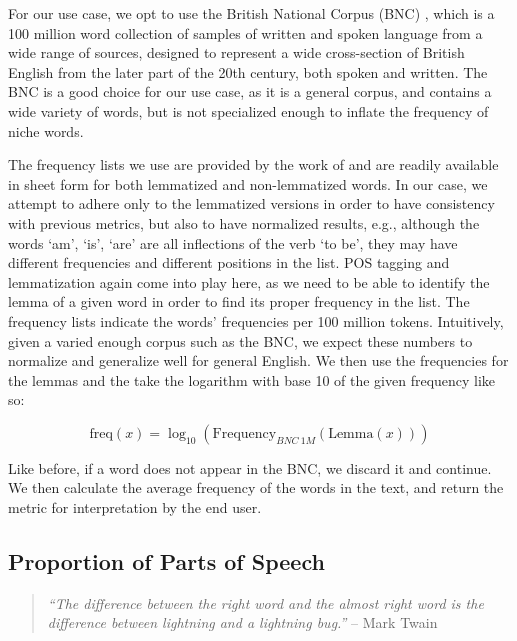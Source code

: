 For our use case, we opt to use the British National Corpus (BNC) \citep{bnc-20.500.14106/2554}, which is a 100 million word collection of samples of written and spoken language from a wide range of sources, designed to represent a wide cross-section of British English from the later part of the 20th century, both spoken and written. The BNC is a good choice for our use case, as it is a general corpus, and contains a wide variety of words, but is not specialized enough to inflate the frequency of niche words. 

The frequency lists we use are provided by the work of \cite{leech_rayson_wilson_2014} and are readily available in sheet form for both lemmatized and non-lemmatized words. In our case, we attempt to adhere only to the lemmatized versions in order to have consistency with previous metrics, but also to have normalized results, e.g., although the words `am', `is', `are' are all inflections of the verb `to be', they may have different frequencies and different positions in the list. POS tagging and lemmatization again come into play here, as we need to be able to identify the lemma of a given word in order to find its proper frequency in the list. The frequency lists indicate the words' frequencies per 100 million tokens. Intuitively, given a varied enough corpus such as the BNC, we expect these numbers to normalize and generalize well for general English. We then use the frequencies for the lemmas and the take the logarithm with base 10 of the given frequency like so:

\begin{equation}
    \label{eq:frequency}
    \text{freq}(x) = \log_{10}(\text{Frequency}_{BNC\ 1M}(\text{Lemma}(x)))
\end{equation}

Like before, if a word does not appear in the BNC, we discard it and continue. We then calculate the average frequency of the words in the text, and return the metric for interpretation by the end user.

\subsection{Proportion of Parts of Speech}
\label{pos_prop}

\begin{quote}
\textit{    “The difference between the right word and the almost right word is the difference between lightning and a lightning bug.”} -- Mark Twain
\end{quote}

